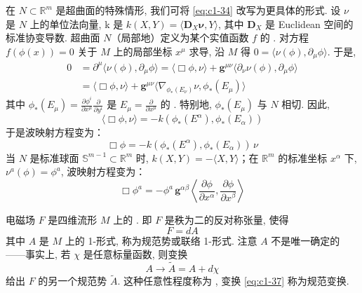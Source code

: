 在 $N\subset \mathbb{R}^m$ 是超曲面的特殊情形, 我们可将 \eqref{eq:c1-34} 改写为更具体的形式. 设 $\nu$ 是 $N$ 上的单位法向量, k 是  $k(X, Y) = \langle\mathbf{D}_X\boldsymbol{\nu}, Y\rangle$, 其中 $\mathbf{D}_X$ 是 Euclidean 空间的标准协变导数. 超曲面 $N$（局部地）定义为某个实值函数 $f$ 的 . 对方程 $f(\phi(x)) = 0$ 关于 $M$ 上的局部坐标 $x^\mu$ 求导, 沿 $M$ 得 $0 = \langle\nu(\phi), \partial_\mu\phi\rangle$. 于是, 
\[
\begin{aligned}
0 &= \partial^\mu\langle\nu(\phi), \partial_\mu\phi\rangle = \langle\Box\phi, \nu\rangle + \mathbf{g}^{\mu\nu}\langle\partial_\nu\nu(\phi), \partial_\mu\phi\rangle\\
&= \langle\Box\phi, \nu\rangle + \mathbf{g}^{\mu\nu}\langle\nabla_{\phi_*(E_\nu)}\nu, \phi_*(E_\mu)\rangle
\end{aligned}
\]
其中 $\phi_*(E_\mu) = \frac{\partial\phi^i}{\partial x^\mu}\frac{\partial}{\partial y^i}$ 是 $E_\mu = \frac{\partial}{\partial x^\mu}$ 的 . 特别地, $\phi_*(E_\mu)$ 与 $N$ 相切. 因此, 
\begin{equation}
\langle\Box\phi, \nu\rangle = -k(\phi_*(E^\alpha), \phi_*(E_\alpha))\label{eq:c1-35}
\end{equation}
于是波映射方程变为：
\[
\Box\phi = -k(\phi_*(E^\alpha), \phi_*(E_\alpha))\, \nu
\]
当 $N$ 是标准球面 $\mathbb{S}^{m-1} \subset \mathbb{R}^m$ 时, $k(X, Y) = -\langle X, Y\rangle$；在 $\mathbb{R}^m$ 的标准坐标 $x^\alpha$ 下, $\nu^a(\phi) = \phi^a$, 波映射方程变为：
\[
\Box\phi^a = -\phi^a\, \mathbf{g}^{\alpha\beta}\left\langle\frac{\partial\phi}{\partial x^\alpha}, \frac{\partial\phi}{\partial x^\beta}\right\rangle
\]


电磁场 $F$ 是四维流形 $M$ 上的 . 即 $F$ 是秩为二的反对称张量, 使得
\begin{equation}
F = dA\label{eq:c1-36}
\end{equation}
其中 $A$ 是 $M$ 上的 1-形式, 称为规范势或联络 1-形式. 注意 $A$ 不是唯一确定的——事实上, 若 $\chi$ 是任意标量函数, 则变换
\begin{equation}
A \longrightarrow \tilde{A} = A + d\chi\label{eq:c1-37}
\end{equation}
给出 $F$ 的另一个规范势 $\tilde{A}$. 这种任意性程度称为 , 变换 \eqref{eq:c1-37} 称为规范变换. 

